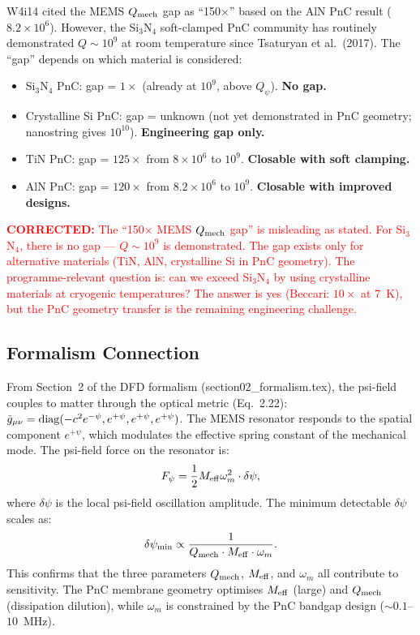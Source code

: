 \documentclass[11pt]{article}
\theoremstyle{definition}
\theoremstyle{remark}
\newcommand{\ee}[1]{\times 10^{#1}}
\newcommand{\Qpsi}{Q_\psi}
\newcommand{\Qmech}{Q_{\rm mech}}
\newcommand{\corrected}[1]{\textcolor{red}{\textbf{CORRECTED:} #1}}
\begin{document}
W4i14 cited the MEMS $Q_{\rm mech}$ gap as ``150$\times$'' based on
the AlN PnC result ($8.2\ee{6}$). However, the Si$_3$N$_4$
soft-clamped PnC community has routinely demonstrated $Q \sim 10^9$
at room temperature since Tsaturyan et al.\ (2017). The ``gap''
depends on which material is considered:
\begin{itemize}[nosep]
\item Si$_3$N$_4$ PnC: gap = $1\times$ (already at $10^9$, above
  $\Qpsi$). \textbf{No gap.}
\item Crystalline Si PnC: gap = unknown (not yet demonstrated in
  PnC geometry; nanostring gives $10^{10}$). \textbf{Engineering
  gap only.}
\item TiN PnC: gap = $125\times$ from $8\ee{6}$ to $10^9$.
  \textbf{Closable with soft clamping.}
\item AlN PnC: gap = $120\times$ from $8.2\ee{6}$ to $10^9$.
  \textbf{Closable with improved designs.}
\end{itemize}

\corrected{The ``150$\times$ MEMS $Q_{\rm mech}$ gap'' is
misleading as stated. For Si$_3$N$_4$, there is no gap --- $Q \sim
10^9$ is demonstrated. The gap exists only for alternative
materials (TiN, AlN, crystalline Si in PnC geometry). The
programme-relevant question is: can we exceed Si$_3$N$_4$ by
using crystalline materials at cryogenic temperatures? The answer
is yes (Beccari: $10\times$ at 7~K), but the PnC geometry
transfer is the remaining engineering challenge.}

\subsection{Formalism Connection}

From Section~2 of the DFD formalism (section02\_formalism.tex),
the psi-field couples to matter through the optical metric
(Eq.~2.22): $\tilde{g}_{\mu\nu} = {\rm diag}(-c^2 e^{-\psi},
e^{+\psi}, e^{+\psi}, e^{+\psi})$. The MEMS resonator responds
to the spatial component $e^{+\psi}$, which modulates the
effective spring constant of the mechanical mode. The psi-field
force on the resonator is:
\begin{equation}
F_\psi = \frac{1}{2} M_{\rm eff} \omega_m^2 \cdot \delta\psi,
\end{equation}
where $\delta\psi$ is the local psi-field oscillation amplitude.
The minimum detectable $\delta\psi$ scales as:
\begin{equation}
\delta\psi_{\rm min} \propto \frac{1}{\Qmech \cdot M_{\rm eff}
\cdot \omega_m}.
\end{equation}
This confirms that the three parameters $\Qmech$, $M_{\rm eff}$,
and $\omega_m$ all contribute to sensitivity. The PnC membrane
geometry optimises $M_{\rm eff}$ (large) and $\Qmech$ (dissipation
dilution), while $\omega_m$ is constrained by the PnC bandgap
design ($\sim 0.1$--$10$~MHz).
\end{document}

